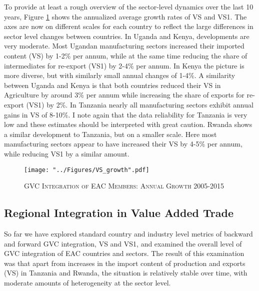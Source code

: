 \documentclass[a4paper]{article}
\begin{document}
To provide at least a rough overview of the sector-level dynamics over the last 10 years, Figure \ref{fig:VSgr} shows the annualized average growth rates of VS and VS1. The axes are now on different scales for each country to reflect the large differences in sector level changes between countries. In Uganda and Kenya, developments are very moderate. Most Ugandan manufacturing sectors increased their imported content (VS) by 1-2\% per annum, while at the same time reducing the share of intermediates for re-export (VS1) by 2-4\% per annum. In Kenya the picture is more diverse, but with similarly small annual changes of 1-4\%. A similarity between Uganda and Kenya is that both countries reduced their VS in Agriculture by around 3\% per annum while increasing the share of exports for re-export (VS1) by 2\%. In Tanzania nearly all manufacturing sectors exhibit annual gains in VS of 8-10\%. I note again that the data reliability for Tanzania is very low and these estimates should be interpreted with great caution. Rwanda shows a similar development to Tanzania, but on a smaller scale. Here most manufacturing sectors appear to have increased their VS by 4-5\% per annum, while reducing VS1 by a similar amount.

\begin{figure}[h!]
\centering
\caption{\label{fig:VSgr}\textsc{GVC Integration of EAC Members: Annual Growth 2005-2015}}
\texttt{[image: "../Figures/VS\_growth".pdf]} %
\end{figure}
\FloatBarrier





\subsection{Regional Integration in Value Added Trade}
So far we have explored standard country and industry level metrics of backward and forward GVC integration, VS and VS1, and examined the overall level of GVC integration of EAC countries and sectors. The result of this examination was that apart from increases in the import content of production and exports (VS) in Tanzania and Rwanda, the situation is relatively stable over time, with moderate amounts of heterogeneity at the sector level. \newline
\end{document}
